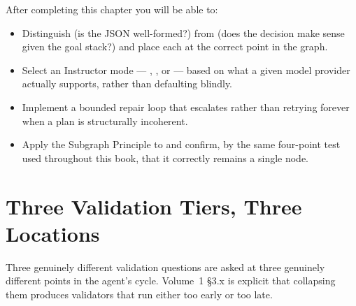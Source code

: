 

\begin{learningbox}
After completing this chapter you will be able to:
\begin{itemize}
  \item Distinguish  (is the JSON
        well-formed?) from  (does the
        decision make sense given the goal stack?) and place each at the
        correct point in the graph.
  \item Select an Instructor mode --- , , or
         --- based on what a given model provider actually
        supports, rather than defaulting blindly.
  \item Implement a bounded repair loop that escalates rather than
        retrying forever when a plan is structurally incoherent.
  \item Apply the Subgraph Principle to  and
        confirm, by the same four-point test used throughout this book,
        that it correctly remains a single node.
\end{itemize}
\end{learningbox}

\section{Three Validation Tiers, Three Locations}
\label{sec:three-tiers}

Three genuinely different validation questions are asked at three
genuinely different points in the agent's cycle.  Volume~1 §3.x is
explicit that collapsing them produces validators that run either too
early or too late.

